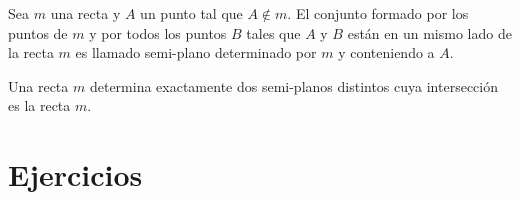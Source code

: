 \begin{tcolorbox}[colframe=white]
\begin{def.}
    Sea $m$ una recta y $A$ un punto tal que $A\notin m.$ El conjunto formado por los puntos de $m$ y por todos los puntos $B$ tales que $A$ y $B$ están en un mismo lado de la recta $m$ es llamado semi-plano determinado por $m$ y conteniendo a $A$.
\end{def.}
\end{tcolorbox}

\begin{tcolorbox}[colframe=white]
    \begin{axioma}
	Una recta $m$ determina exactamente dos semi-planos distintos cuya intersección es la recta $m$.
    \end{axioma}
\end{tcolorbox}

\section{Ejercicios}


